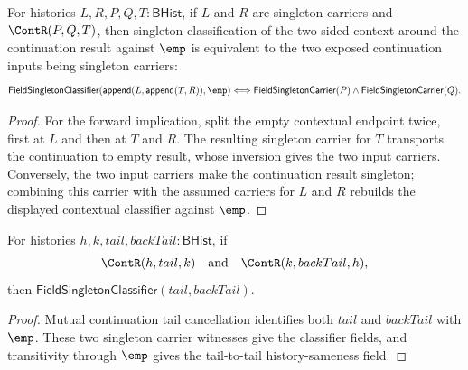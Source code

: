 \begin{theorem}
\label{thm:field-singleton-continuation-result-context}
For histories $L,R,P,Q,T:\mathsf{BHist}$, if $L$ and $R$ are singleton
carriers and $\ContR(P,Q,T)$, then singleton classification of the
two-sided context around the continuation result against $\emp$ is equivalent
to the two exposed continuation inputs being singleton carriers:
$$
\mathsf{FieldSingletonClassifier}
  (\mathsf{append}(L,\mathsf{append}(T,R)),\emp)
\Longleftrightarrow
\mathsf{FieldSingletonCarrier}(P)\land\mathsf{FieldSingletonCarrier}(Q).
$$
\end{theorem}
\begin{proof}
For the forward implication, split the empty contextual endpoint twice, first
at $L$ and then at $T$ and $R$. The resulting singleton carrier for $T$
transports the continuation to empty result, whose inversion gives the two
input carriers. Conversely, the two input carriers make the continuation
result singleton; combining this carrier with the assumed carriers for $L$
and $R$ rebuilds the displayed contextual classifier against $\emp$.
\end{proof}

\begin{theorem}
\label{thm:fieldup-singleton-cycle-tail-classifier}
For histories $h,k,tail,backTail:\mathsf{BHist}$, if
$$
\ContR(h,tail,k)
\quad\text{and}\quad
\ContR(k,backTail,h),
$$
then $\mathsf{FieldSingletonClassifier}(tail,backTail)$.
\end{theorem}
\begin{proof}
Mutual continuation tail cancellation identifies both $tail$ and $backTail$
with $\emp$. These two singleton carrier witnesses give the classifier fields,
and transitivity through $\emp$ gives the tail-to-tail history-sameness field.
\end{proof}
